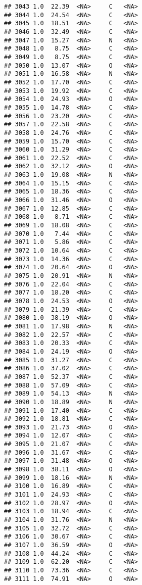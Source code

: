 \documentclass[
]{article}
\begin{document}
\begin{verbatim}
## 3043 1.0  22.39  <NA>     C   <NA>
## 3044 1.0  24.54  <NA>     C   <NA>
## 3045 1.0  18.51  <NA>     C   <NA>
## 3046 1.0  32.49  <NA>     C   <NA>
## 3047 1.0  15.27  <NA>     N   <NA>
## 3048 1.0   8.75  <NA>     C   <NA>
## 3049 1.0   8.75  <NA>     C   <NA>
## 3050 1.0  13.07  <NA>     O   <NA>
## 3051 1.0  16.58  <NA>     N   <NA>
## 3052 1.0  17.70  <NA>     C   <NA>
## 3053 1.0  19.92  <NA>     C   <NA>
## 3054 1.0  24.93  <NA>     O   <NA>
## 3055 1.0  14.78  <NA>     C   <NA>
## 3056 1.0  23.20  <NA>     C   <NA>
## 3057 1.0  22.58  <NA>     C   <NA>
## 3058 1.0  24.76  <NA>     C   <NA>
## 3059 1.0  15.70  <NA>     C   <NA>
## 3060 1.0  31.29  <NA>     C   <NA>
## 3061 1.0  22.52  <NA>     C   <NA>
## 3062 1.0  32.12  <NA>     O   <NA>
## 3063 1.0  19.08  <NA>     N   <NA>
## 3064 1.0  15.15  <NA>     C   <NA>
## 3065 1.0  18.36  <NA>     C   <NA>
## 3066 1.0  31.46  <NA>     O   <NA>
## 3067 1.0  12.85  <NA>     C   <NA>
## 3068 1.0   8.71  <NA>     C   <NA>
## 3069 1.0  18.08  <NA>     C   <NA>
## 3070 1.0   7.44  <NA>     C   <NA>
## 3071 1.0   5.86  <NA>     C   <NA>
## 3072 1.0  10.64  <NA>     C   <NA>
## 3073 1.0  14.36  <NA>     C   <NA>
## 3074 1.0  20.64  <NA>     O   <NA>
## 3075 1.0  20.91  <NA>     N   <NA>
## 3076 1.0  22.04  <NA>     C   <NA>
## 3077 1.0  18.20  <NA>     C   <NA>
## 3078 1.0  24.53  <NA>     O   <NA>
## 3079 1.0  21.39  <NA>     C   <NA>
## 3080 1.0  38.19  <NA>     O   <NA>
## 3081 1.0  17.98  <NA>     N   <NA>
## 3082 1.0  22.57  <NA>     C   <NA>
## 3083 1.0  20.33  <NA>     C   <NA>
## 3084 1.0  24.19  <NA>     O   <NA>
## 3085 1.0  31.27  <NA>     C   <NA>
## 3086 1.0  37.02  <NA>     C   <NA>
## 3087 1.0  52.37  <NA>     C   <NA>
## 3088 1.0  57.09  <NA>     C   <NA>
## 3089 1.0  54.13  <NA>     N   <NA>
## 3090 1.0  18.89  <NA>     N   <NA>
## 3091 1.0  17.40  <NA>     C   <NA>
## 3092 1.0  18.81  <NA>     C   <NA>
## 3093 1.0  21.73  <NA>     O   <NA>
## 3094 1.0  12.07  <NA>     C   <NA>
## 3095 1.0  21.07  <NA>     C   <NA>
## 3096 1.0  31.67  <NA>     C   <NA>
## 3097 1.0  31.48  <NA>     O   <NA>
## 3098 1.0  38.11  <NA>     O   <NA>
## 3099 1.0  18.16  <NA>     N   <NA>
## 3100 1.0  16.89  <NA>     C   <NA>
## 3101 1.0  24.93  <NA>     C   <NA>
## 3102 1.0  28.97  <NA>     O   <NA>
## 3103 1.0  18.94  <NA>     C   <NA>
## 3104 1.0  31.76  <NA>     N   <NA>
## 3105 1.0  32.72  <NA>     C   <NA>
## 3106 1.0  30.67  <NA>     C   <NA>
## 3107 1.0  36.59  <NA>     O   <NA>
## 3108 1.0  44.24  <NA>     C   <NA>
## 3109 1.0  62.20  <NA>     C   <NA>
## 3110 1.0  73.36  <NA>     C   <NA>
## 3111 1.0  74.91  <NA>     O   <NA>

\end{verbatim}
\end{document}
